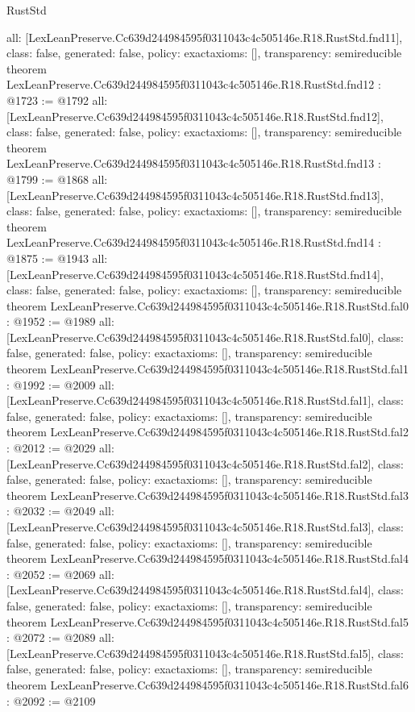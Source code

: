 \begin{lexlean}{RustStd}
\begin{coremodule}
{  all: [LexLeanPreserve.Cc639d244984595f0311043c4c505146e.R18.RustStd.fnd11],
  class: false,
  generated: false,
  policy: exact{axioms: []},
  transparency: semireducible
}
theorem LexLeanPreserve.Cc639d244984595f0311043c4c505146e.R18.RustStd.fnd12 : @1723 := @1792 {
  all: [LexLeanPreserve.Cc639d244984595f0311043c4c505146e.R18.RustStd.fnd12],
  class: false,
  generated: false,
  policy: exact{axioms: []},
  transparency: semireducible
}
theorem LexLeanPreserve.Cc639d244984595f0311043c4c505146e.R18.RustStd.fnd13 : @1799 := @1868 {
  all: [LexLeanPreserve.Cc639d244984595f0311043c4c505146e.R18.RustStd.fnd13],
  class: false,
  generated: false,
  policy: exact{axioms: []},
  transparency: semireducible
}
theorem LexLeanPreserve.Cc639d244984595f0311043c4c505146e.R18.RustStd.fnd14 : @1875 := @1943 {
  all: [LexLeanPreserve.Cc639d244984595f0311043c4c505146e.R18.RustStd.fnd14],
  class: false,
  generated: false,
  policy: exact{axioms: []},
  transparency: semireducible
}
theorem LexLeanPreserve.Cc639d244984595f0311043c4c505146e.R18.RustStd.fal0 : @1952 := @1989 {
  all: [LexLeanPreserve.Cc639d244984595f0311043c4c505146e.R18.RustStd.fal0],
  class: false,
  generated: false,
  policy: exact{axioms: []},
  transparency: semireducible
}
theorem LexLeanPreserve.Cc639d244984595f0311043c4c505146e.R18.RustStd.fal1 : @1992 := @2009 {
  all: [LexLeanPreserve.Cc639d244984595f0311043c4c505146e.R18.RustStd.fal1],
  class: false,
  generated: false,
  policy: exact{axioms: []},
  transparency: semireducible
}
theorem LexLeanPreserve.Cc639d244984595f0311043c4c505146e.R18.RustStd.fal2 : @2012 := @2029 {
  all: [LexLeanPreserve.Cc639d244984595f0311043c4c505146e.R18.RustStd.fal2],
  class: false,
  generated: false,
  policy: exact{axioms: []},
  transparency: semireducible
}
theorem LexLeanPreserve.Cc639d244984595f0311043c4c505146e.R18.RustStd.fal3 : @2032 := @2049 {
  all: [LexLeanPreserve.Cc639d244984595f0311043c4c505146e.R18.RustStd.fal3],
  class: false,
  generated: false,
  policy: exact{axioms: []},
  transparency: semireducible
}
theorem LexLeanPreserve.Cc639d244984595f0311043c4c505146e.R18.RustStd.fal4 : @2052 := @2069 {
  all: [LexLeanPreserve.Cc639d244984595f0311043c4c505146e.R18.RustStd.fal4],
  class: false,
  generated: false,
  policy: exact{axioms: []},
  transparency: semireducible
}
theorem LexLeanPreserve.Cc639d244984595f0311043c4c505146e.R18.RustStd.fal5 : @2072 := @2089 {
  all: [LexLeanPreserve.Cc639d244984595f0311043c4c505146e.R18.RustStd.fal5],
  class: false,
  generated: false,
  policy: exact{axioms: []},
  transparency: semireducible
}
theorem LexLeanPreserve.Cc639d244984595f0311043c4c505146e.R18.RustStd.fal6 : @2092 := @2109 {
}
\end{coremodule}
\end{lexlean}
